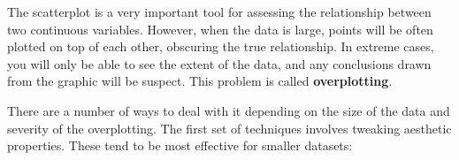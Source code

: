 
The scatterplot is a very important tool for assessing the relationship
between two continuous variables. However, when the data is large,
points will be often plotted on top of each other, obscuring the true
relationship. In extreme cases, you will only be able to see the extent
of the data, and any conclusions drawn from the graphic will be suspect.
This problem is called \textbf{overplotting}. 

There are a number of ways to deal with it depending on the size of the
data and severity of the overplotting. The first set of techniques
involves tweaking aesthetic properties. These tend to be most effective
for smaller datasets:

